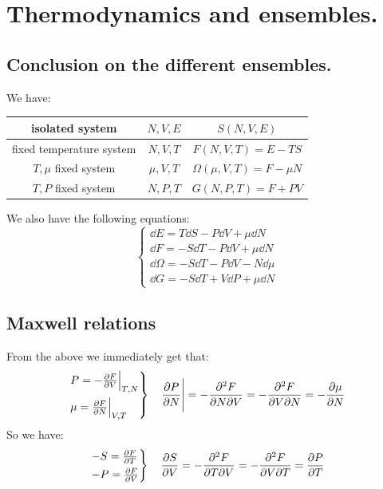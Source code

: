 \documentclass[10pt,a4paper]{book}
\begin{document}
\section{Thermodynamics and ensembles.}
\subsection{Conclusion on the different ensembles.}
We have:
\begin{center}
\begin{tabular}{c | c | c |}
isolated system & $N, V, E$ & $S(N,V,E)$\\
\hline
fixed temperature system & $N, V, T$ & $F(N, V, T)=E-TS$\\
\hline
$T, \mu$ fixed system & $\mu, V, T$ & $\Omega(\mu, V, T)=F-\mu N$\\
\hline
$T, P$ fixed system & $N, P, T$ & $G(N, P, T)=F+PV$\\
\hline
\end{tabular}
\end{center}
We also have the following equations:
\[
\begin{cases}
\dd E = T \dd S - P \dd V + \mu \dd N\\
\dd F = - S \dd T - P \dd V + \mu \dd N\\
\dd \Omega = - S \dd T - P \dd V - N \dd \mu\\
\dd G = - S \dd T + V \dd P + \mu \dd N
\end{cases}
\]
\subsection{Maxwell relations}
From the above we immediately get that:
\[
\begin{rcases}
P = - \pdv{F}{V} \Big|_{T, N}\\
\mu = \pdv{F}{N} \Big|_{V,T}
\end{rcases}
\quad \pdv{P}{N} \Bigg| = -\pdv[2]{F}{N}{V} = - \pdv[2]{F}{V}{N} = -\pdv{\mu}{N}
\]
So we have:
\[
\begin{rcases}
-S = \pdv{F}{T}\\
-P = \pdv{F}{V}
\end{rcases}\quad \pdv{S}{V} = - \pdv[2]{F}{T}{V} = -\pdv[2]{F}{V}{T} = \pdv{P}{T}
\]
\end{document}

